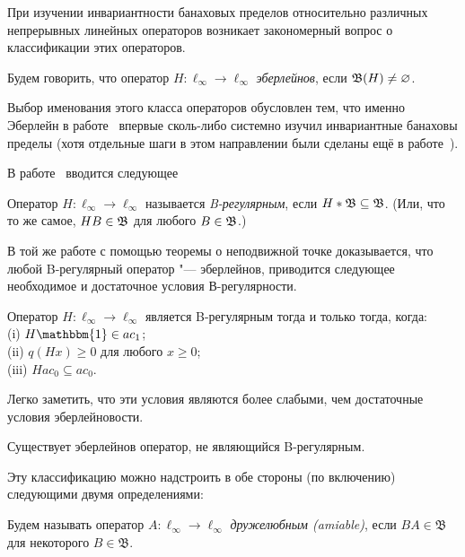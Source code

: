 При изучении инвариантности банаховых пределов относительно различных непрерывных линейных операторов
возникает закономерный вопрос о классификации этих операторов.

\begin{definition}
	Будем говорить, что оператор $H : \ell_\infty \to \ell_\infty$ \emph{эберлейнов},
	если $\mathfrak{B} (H) \ne \varnothing$.
\end{definition}

Выбор именования этого класса операторов обусловлен тем, что именно Эберлейн в работе~\cite{Eberlein}
впервые сколь-либо системно изучил инвариантные банаховы пределы
(хотя отдельные шаги в этом направлении были сделаны ещё в работе~\cite{agnew1938extensions}).

В работе~\cite{alekhno2018invariant} вводится следующее

\begin{definition}
	Оператор $H : \ell_\infty \to \ell_\infty$ называется \emph{B-регулярным},
	если $H*\mathfrak{B} \subseteq \mathfrak{B}$.
	(Или, что то же самое, $HB\in\mathfrak{B}$ для любого $B\in\mathfrak{B}$.)
\end{definition}

В той же работе с помощью теоремы о неподвижной точке доказывается,
что любой B-регулярный оператор "--- эберлейнов, приводится следующее необходимое и достаточное условия В-регулярности.

\begin{theorem}
	Оператор $H:\ell_\infty \to \ell_\infty$ является B-регулярным тогда и только тогда, когда:
	\\(i) $H\mathbbm{1} \in ac_1$;
	\\(ii) $q(Hx)\geq 0$ для любого $x\geq 0$;
	\\(iii) $H ac_0 \subseteq ac_0$.
\end{theorem}
Легко заметить, что эти условия являются более слабыми, чем достаточные условия эберлейновости.


\begin{hypothesis}
	Существует эберлейнов оператор, не являющийся B-регулярным.
\end{hypothesis}

Эту классификацию можно надстроить в обе стороны (по включению) следующими двумя определениями:

\begin{definition}
	Будем называть оператор $A:\ell_\infty \to \ell_\infty$ \emph{дружелюбным (amiable)}, если $BA\in\mathfrak B$ для некоторого $B\in\mathfrak B$.
\end{definition}

